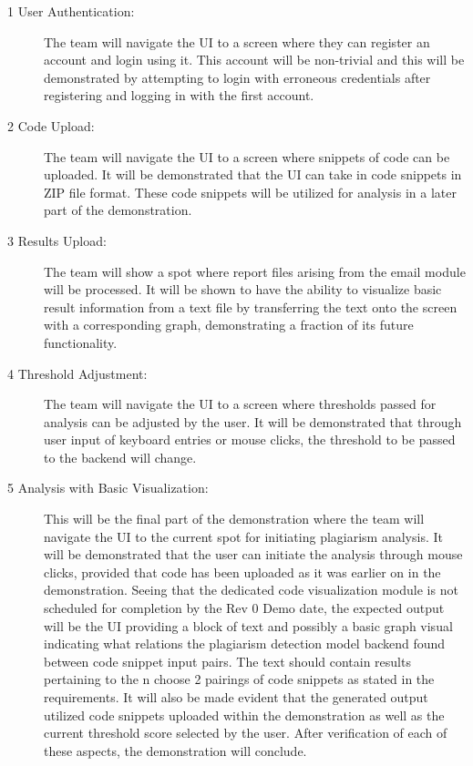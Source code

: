 \documentclass{article}
\begin{document}
\begin{description}
    \item[1 User Authentication:] The team will navigate the UI to a screen where they can 
    register an account and login using it. This account will be non-trivial and this will 
    be demonstrated by attempting to login with erroneous credentials after registering and 
    logging in with the first account.

    \item[2 Code Upload:] The team will navigate the UI to a screen where snippets of code 
    can be uploaded. It will be demonstrated that the UI can take in code snippets in ZIP file 
    format. These code snippets will be utilized for analysis in a later part of the demonstration.

    \item[3 Results Upload:] The team will show a spot where report files arising from the email 
    module will be processed. It will be shown to have the ability to visualize basic result 
    information from a text file by transferring the text onto the screen with a corresponding graph, 
    demonstrating a fraction of its future functionality.

    \item[4 Threshold Adjustment:] The team will navigate the UI to a screen where thresholds passed
    for analysis can be adjusted by the user. It will be demonstrated that through user input 
    of keyboard entries or mouse clicks, the threshold to be passed to the backend will change.

    \item[5 Analysis with Basic Visualization:] This will be the final part of the demonstration where 
    the team will navigate the UI to the current spot for initiating plagiarism analysis. It will be 
    demonstrated that the user can initiate the analysis through mouse clicks, provided that code has 
    been uploaded as it was earlier on in the demonstration. Seeing that the dedicated code visualization 
    module is not scheduled for completion by the Rev 0 Demo date, the expected output will be the UI providing 
    a block of text and possibly a basic graph visual indicating what relations the plagiarism detection model
    backend found between code snippet input pairs. The text should contain results pertaining to the n choose 2 
    pairings of code snippets as stated in the requirements. It will also be made evident that the generated output 
    utilized code snippets uploaded within the demonstration as well as the current threshold score selected by the user. 
    After verification of each of these aspects, the demonstration will conclude.

\end{description}
\end{document}
